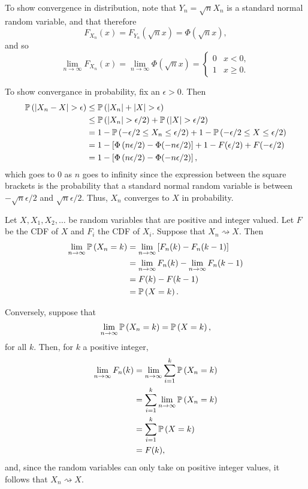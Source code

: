 \begin{ex}
  To show convergence in distribution, note that $Y_n=\sqrt{n} X_n$ is a
  standard normal random variable, and that therefore
  \[
    F_{X_n}(x)=F_{Y_n}(\sqrt{n} x)=\Phi(\sqrt{n} x),
  \]
  and so
  \[
    \lim_{n\to\infty} F_{X_n}(x)
    =\lim_{n\to\infty} \Phi(\sqrt{n}x)
    =\begin{cases}
      0 & x < 0,   \\
      1 & x\geq 0.
    \end{cases}
  \]

  To show convergance in probability, fix an $\epsilon>0$. Then
  \begin{align*}
    \P{|X_n-X|>\epsilon}
     & \leq \P{|X_n|+|X|>\epsilon}                                      \\
     & \leq \P{|X_n|>\epsilon/2}+\P{|X|>\epsilon/2}                     \\
     & = 1 - \P{-\epsilon/2\leq X_n\leq \epsilon/2}
    + 1 - \P{-\epsilon/2\leq X\leq \epsilon/2}                          \\
     & =1-\left[\Phi\left(n\epsilon/2\right)-\Phi(-n\epsilon/2)\right]
    +1 - F(\epsilon/2) + F(-\epsilon/2)                                 \\
     & =1-\left[\Phi\left(n\epsilon/2\right)-\Phi(-n\epsilon/2)\right],
  \end{align*}
  which goes to $0$ as $n$ goes to infinity since the expression between the
  square brackets is the probability that a standard normal random variable is
  between $-\sqrt{n}\epsilon/2$ and $\sqrt{n}\epsilon/2$. Thus, $X_n$ converges
  to $X$ in probability.

\end{ex}

\begin{ex}
  Let $X,X_1,X_2,\ldots$ be random variables that are positive and integer
  valued. Let $F$ be the CDF of $X$ and $F_i$ the CDF of $X_i$. Suppose that
  $X_n\rightsquigarrow X$. Then
  \begin{align*}
    \lim_{n\to\infty}\P{X_n=k}
     & =\lim_{n\to\infty}\left[F_n(k)-F_n(k-1)\right]     \\
     & =\lim_{n\to\infty}F_n(k)-\lim_{n\to\infty}F_n(k-1) \\
     & =F(k) - F(k-1)                                     \\
     & =\P{X=k}.
  \end{align*}

  Conversely, suppose that
  \[
    \lim_{n\to\infty}\P{X_n=k}=\P{X=k},
  \]
  for all $k$. Then, for $k$ a positive integer,
  \begin{align*}
    \lim_{n\to\infty} F_n(k)
     & =\lim_{n\to\infty}\sum_{i=1}^k \P{X_n=k} \\
     & =\sum_{i=1}^k\lim_{n\to\infty} \P{X_n=k} \\
     & =\sum_{i=1}^k \P{X=k}                    \\
     & =F(k),
  \end{align*}
  and, since the random variables can only take on positive integer values, it
  follows that $X_n\rightsquigarrow X$.
\end{ex}

